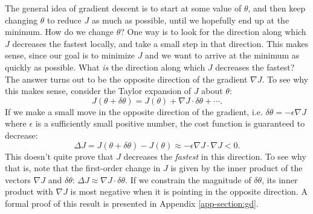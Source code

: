 \documentclass{article}
\theoremstyle{definition}
\begin{document}
The general idea of gradient descent is to start at some value of $\theta$, and then keep changing $\theta$ to reduce $J$ as much as possible, until we hopefully end up at the minimum. How do we change $\theta$? One way is to look for the direction along which $J$ decreases the fastest locally, and take a small step in that direction. This makes sense, since our goal is to minimize $J$ and we want to arrive at the minimum as quickly as possible. What \textit{is} the direction along which $J$ decreases the fastest? The answer turns out to be the opposite direction of the gradient $\nabla J$. To see why this makes sense, consider the Taylor expansion of $J$ about $\theta$:
\begin{equation}
    J(\theta + \delta\theta) =  J(\theta) + \nabla J \cdot \delta\theta + \cdots.
\end{equation}
If we make a small move in the opposite direction of the gradient, i.e. $\delta\theta = -\epsilon \nabla J$ where $\epsilon$ is a sufficiently small positive number, the cost function is guaranteed to decrease:
\begin{equation}
   \Delta J = J(\theta + \delta\theta) -  J(\theta) \approx -\epsilon \nabla J \cdot \nabla J < 0.
\end{equation}
This doesn't quite prove that $J$ decreases the \textit{fastest} in this direction. To see why that is, note that the first-order change in $J$ is given by the inner product of the vectors $\nabla J$ and $\delta \theta$: $\Delta J \approx \nabla J \cdot \delta\theta$. If we constrain the magnitude of $\delta \theta$, its inner product with $\nabla J$ is most negative when it is pointing in the opposite direction. A formal proof of this result is presented in Appendix \ref{app-section:gd}.
\end{document}
